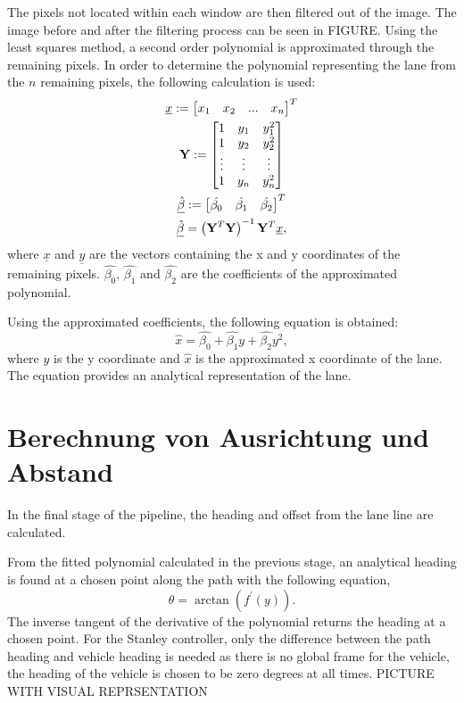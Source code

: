 \documentclass[arbeit=studie,oneside,BCOR=12mm]{ArbeitRST}
\begin{document}
The pixels not located within each window are then filtered out of the image.
The image before and after the filtering process can be seen in FIGURE. Using
the least squares method, a second order polynomial is approximated through the
remaining pixels.
In order to determine the polynomial representing the lane from the $n$ remaining pixels, the following calculation is used: \begin{gather} \underline{x} := \begin{bmatrix} x_1 & x_2 & ... & x_n \end{bmatrix}^T \\ \bold{Y} := \begin{bmatrix} 1 & y_1 & y_1^2 \\ 1 & y_2 & y_2^2 \\ \vdots & \vdots & \vdots \\ 1 & y_n & y_n^2 \end{bmatrix} \\ \underline{\hat{\beta}} := \begin{bmatrix} \hat{\beta_0} & \hat{\beta_1} & \hat{\beta_2} \end{bmatrix}^T \\ \underline{\hat{\beta}} = \left(\bold{Y}^T\bold{Y}\right)^{-1}\bold{Y}^T\underline{x}, \end{gather} where $\underline{x}$ and $\underline{y}$ are the vectors containing the x and y coordinates of the remaining pixels. $\hat{\beta_0}$, $\hat{\beta_1}$ and $\hat{\beta_2}$ are the coefficients of the approximated polynomial. 

Using the approximated coefficients, the following equation is obtained: \begin{equation} \hat{x} = \hat{\beta_0} + \hat{\beta_1}y + \hat{\beta_2}y^2, \end{equation} where $y$ is the y coordinate and $\hat{x}$ is the approximated x coordinate of the lane. The equation provides an analytical representation of the lane. 

\section{Berechnung von Ausrichtung und Abstand}
In the final stage of the pipeline, the heading and offset from the lane line
are calculated. 

From the fitted polynomial calculated in the previous stage, an analytical
heading is found at a chosen point along the path with the following equation,
\begin{equation}
  \theta = \arctan(f^\prime(y)).
\end{equation}
The inverse tangent of the derivative of
the polynomial returns the heading at a chosen point. For the Stanley
controller, only the difference between the path heading and vehicle heading
is needed as there is no global frame for the vehicle, the heading
of the vehicle is chosen to be zero degrees at all times. PICTURE WITH VISUAL
REPRSENTATION 
\end{document}
